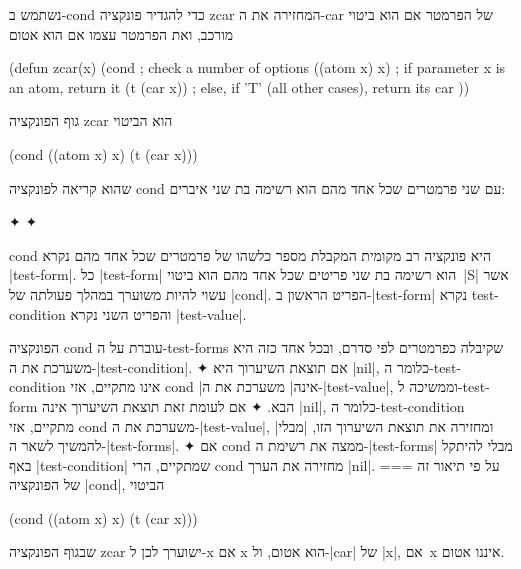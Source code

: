 נשתמש ב-cond כדי להגדיר פונקציה zcar המחזירה את ה-car של הפרמטר אם
הוא ביטוי מורכב, ואת הפרמטר עצמו אם הוא אטום
\begin{LISP}
(defun zcar(x)
  (cond ; check a number of options
    ((atom x) x) ; if parameter x is an atom, return it
    (t (car x)) ; else, if 'T' (all other cases), return its car
))
\end{LISP}
גוף הפונקציה zcar הוא הביטוי
\begin{LISP}
  (cond ((atom x) x) (t (car x)))
\end{LISP}
שהוא קריאה לפונקציה cond עם שני פרמטרים שכל אחד מהם הוא רשימה בת שני איברים:
\begin{LTR}
  \begin{itemize}
    ✦ 
    ✦ 
  \end{itemize}
\end{LTR}
cond היא פונקציה רב מקומית המקבלת מספר כלשהו של פרמטרים שכל אחד מהם נקרא
\E|test-form|. כל \E|test-form| הוא רשימה בת שני פריטים שכל אחד מהם הוא ביטוי~\E|S|
אשר עשוי להיות משוערך במהלך פעולתה של \E|cond|. הפריט הראשון ב-\E|test-form|
נקרא test-condition והפריט השני נקרא \E|test-value|.

הפונקציה cond עוברת על ה-test-forms שקיבלה כפרמטרים לפי סדרם, ובכל אחד כזה היא
משערכת את ה-\E|test-condition|.
✦ אם תוצאת השיערוך היא \E|nil|, כלומר ה-test-condition אינו מתקיים, אזי cond
\ע|אינה| משערכת את ה-\E|test-value|, וממשיכה ל-test-form הבא.
✦ אם לעומת זאת תוצאת השיערוך אינה \E|nil|, כלומר ה-test-condition מתקיים, אזי
cond משערכת את ה-\E|test-value|, ומחזירה את תוצאת השיערוך הזו, \ע|מבלי|
להמשיך לשאר ה-\E|test-forms|.
✦ אם cond ממצה את רשימת ה-\E|test-forms| מבלי להיתקל באף \E|test-condition|
שמתקיים, הרי cond מחזירה את הערך \E|nil|.
===
על פי תיאור זה של הפונקציה \E|cond|, הביטוי \begin{LISP}
  (cond ((atom x) x) (t (car x)))
\end{LISP}
שבגוף הפונקציה zcar ישוערך לכן ל-x אם x הוא אטום, ול-\E|car| של \E|x|, אם~x
איננו אטום.

